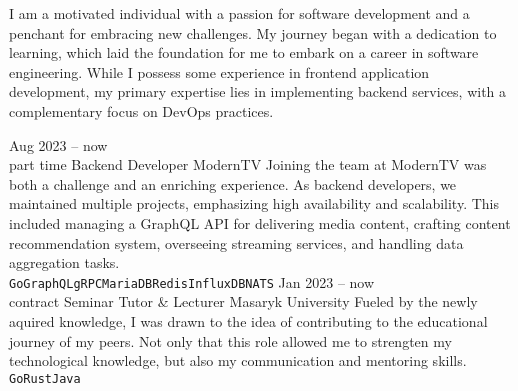 \documentclass[9pt]{cv}
\begin{document}
\begin{minipage}[t]{0.4\textwidth} %
	\vspace{-\baselineskip} %
	
	I am a motivated individual with a passion for software development and a penchant for embracing new challenges. My journey began with a dedication to learning, which laid the foundation for me to embark on a career in software engineering. While I possess some experience in frontend application development, my primary expertise lies in implementing backend services, with a complementary focus on DevOps practices.
\end{minipage}
\hfill %
\begin{minipage}[t]{0.5\textwidth} %
	\vspace{-\baselineskip} %
	\begin{barchart}{5.5}
	\end{barchart}
\end{minipage}

\begin{center}
\end{center}


\begin{entrylist}
	\entry
		{Aug 2023 -- now\\\footnotesize{part time}}
		{Backend Developer}
		{ModernTV}
		{Joining the team at ModernTV was both a challenge and an enriching experience. As backend developers, we maintained multiple projects, emphasizing high availability and scalability. This included managing a GraphQL API for delivering media content, crafting content recommendation system, overseeing streaming services, and handling data aggregation tasks.\\ \texttt{Go}\slashsep\texttt{GraphQL}\slashsep\texttt{gRPC}\slashsep\texttt{MariaDB}\slashsep\texttt{Redis}\slashsep\texttt{InfluxDB}\slashsep\texttt{NATS}}
	\entry
		{Jan 2023 -- now\\\footnotesize{contract}}
        {Seminar Tutor \& Lecturer}
		{Masaryk University}
		{Fueled by the newly aquired knowledge, I was drawn to the idea of contributing to the educational journey of my peers. Not only that this role allowed me to strengten my technological knowledge, but also my communication and mentoring skills.\\ \texttt{Go}\slashsep\texttt{Rust}\slashsep\texttt{Java}}
\end{entrylist}
\end{document}
